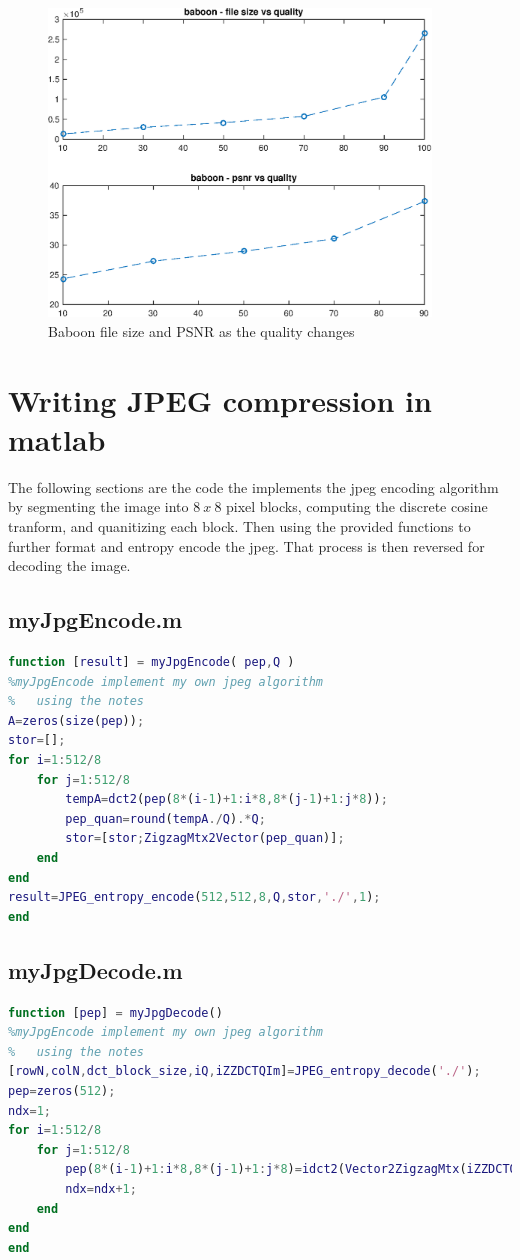 \documentclass{article}
\begin{document}
\begin{figure}[H]
\centering
\includegraphics [width=4in]{lab2_02.eps}
\caption{Baboon file size and PSNR as the quality changes}
\label{baboonGraph}
\end{figure}

\newpage
\section{Writing JPEG compression in matlab}

\qquad The following sections are the code the implements the jpeg encoding
algorithm by segmenting the image into $8 \ x \ 8$ pixel blocks, computing
the discrete cosine tranform, and quanitizing each block. Then using the
provided functions to further format and entropy encode the jpeg. That
process is then reversed for decoding the image. 

\subsection*{myJpgEncode.m}
\begin{lstlisting}[language=Matlab]
function [result] = myJpgEncode( pep,Q )
%myJpgEncode implement my own jpeg algorithm
%   using the notes 
A=zeros(size(pep)); 
stor=[];
for i=1:512/8
    for j=1:512/8
        tempA=dct2(pep(8*(i-1)+1:i*8,8*(j-1)+1:j*8)); 
        pep_quan=round(tempA./Q).*Q; 
        stor=[stor;ZigzagMtx2Vector(pep_quan)];
    end 
end
result=JPEG_entropy_encode(512,512,8,Q,stor,'./',1);
end
\end{lstlisting}


\subsection*{myJpgDecode.m}
\begin{lstlisting}[language=Matlab]
function [pep] = myJpgDecode()
%myJpgEncode implement my own jpeg algorithm
%   using the notes 
[rowN,colN,dct_block_size,iQ,iZZDCTQIm]=JPEG_entropy_decode('./');
pep=zeros(512);
ndx=1;
for i=1:512/8
    for j=1:512/8
        pep(8*(i-1)+1:i*8,8*(j-1)+1:j*8)=idct2(Vector2ZigzagMtx(iZZDCTQIm(ndx,:)));
        ndx=ndx+1;
    end 
end 
end
\end{lstlisting}
\end{document}
